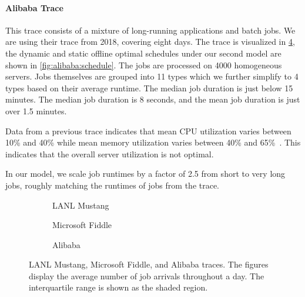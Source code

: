 \paragraph{Alibaba Trace~\cite{Alibaba2018}} This trace consists of a mixture of long-running applications and batch jobs. We are using their trace from 2018, covering eight days. The trace is visualized in \cref{fig:alibaba:histogram}, the dynamic and static offline optimal schedules under our second model are shown in \cref{fig:alibaba:schedule}. The jobs are processed on 4000 homogeneous servers. Jobs themselves are grouped into 11 types which we further simplify to 4 types based on their average runtime. The median job duration is just below 15 minutes. The median job duration is 8 seconds, and the mean job duration is just over 1.5 minutes.

Data from a previous trace indicates that mean CPU utilization varies between 10\% and 40\% while mean memory utilization varies between 40\% and 65\%~\cite{Lu2017}. This indicates that the overall server utilization is not optimal.

In our model, we scale job runtimes by a factor of 2.5 from short to very long jobs, roughly matching the runtimes of jobs from the trace.

\begin{figure}
    \begin{subfigure}[b]{.3425\linewidth}
    \resizebox{\textwidth}{!}{}
    \caption{LANL Mustang}\label{fig:los_alamos:histogram}
    \end{subfigure}
    \begin{subfigure}[b]{.32\linewidth}
    \resizebox{\textwidth}{!}{}
    \caption{Microsoft Fiddle}\label{fig:microsoft:histogram}
    \end{subfigure}
    \begin{subfigure}[b]{.32\linewidth}
    \resizebox{\textwidth}{!}{}
    \caption{Alibaba}\label{fig:alibaba:histogram}
    \end{subfigure}
    \caption{LANL Mustang, Microsoft Fiddle, and Alibaba traces. The figures display the average number of job arrivals throughout a day. The interquartile range is shown as the shaded region.}
\end{figure}

